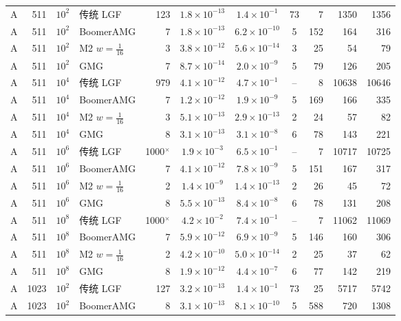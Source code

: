 \begin{longtable}{lrrlrcccrrr}
A & 511 & $10^{2}$ & 传统 LGF & 123 & $1.8{\times}10^{-13}$ & $1.4{\times}10^{-1}$ & 73 & 7 & 1350 & 1356 \\
A & 511 & $10^{2}$ & BoomerAMG & 7 & $1.8{\times}10^{-13}$ & $6.2{\times}10^{-10}$ & 5 & 152 & 164 & 316 \\
A & 511 & $10^{2}$ & M2 $w{=}\frac1{16}$ & 3 & $3.8{\times}10^{-12}$ & $5.6{\times}10^{-14}$ & 3 & 25 & 54 & 79 \\
A & 511 & $10^{2}$ & GMG & 7 & $8.7{\times}10^{-14}$ & $2.0{\times}10^{-9}$ & 5 & 79 & 126 & 205 \\
A & 511 & $10^{4}$ & 传统 LGF & 979 & $4.1{\times}10^{-12}$ & $4.7{\times}10^{-1}$ & -- & 8 & 10638 & 10646 \\
A & 511 & $10^{4}$ & BoomerAMG & 7 & $1.2{\times}10^{-12}$ & $1.9{\times}10^{-9}$ & 5 & 169 & 166 & 335 \\
A & 511 & $10^{4}$ & M2 $w{=}\frac1{16}$ & 3 & $5.1{\times}10^{-13}$ & $2.9{\times}10^{-13}$ & 2 & 24 & 57 & 82 \\
A & 511 & $10^{4}$ & GMG & 8 & $3.1{\times}10^{-13}$ & $3.1{\times}10^{-8}$ & 6 & 78 & 143 & 221 \\
A & 511 & $10^{6}$ & 传统 LGF & 1000$^\times$ & $1.9{\times}10^{-3}$ & $6.5{\times}10^{-1}$ & -- & 7 & 10717 & 10725 \\
A & 511 & $10^{6}$ & BoomerAMG & 7 & $4.1{\times}10^{-12}$ & $7.8{\times}10^{-9}$ & 5 & 151 & 167 & 317 \\
A & 511 & $10^{6}$ & M2 $w{=}\frac1{16}$ & 2 & $1.4{\times}10^{-9}$ & $1.4{\times}10^{-13}$ & 2 & 26 & 45 & 72 \\
A & 511 & $10^{6}$ & GMG & 8 & $5.5{\times}10^{-13}$ & $8.4{\times}10^{-8}$ & 6 & 78 & 131 & 208 \\
A & 511 & $10^{8}$ & 传统 LGF & 1000$^\times$ & $4.2{\times}10^{-2}$ & $7.4{\times}10^{-1}$ & -- & 7 & 11062 & 11069 \\
A & 511 & $10^{8}$ & BoomerAMG & 7 & $5.9{\times}10^{-12}$ & $6.9{\times}10^{-9}$ & 5 & 146 & 160 & 306 \\
A & 511 & $10^{8}$ & M2 $w{=}\frac1{16}$ & 2 & $4.2{\times}10^{-10}$ & $5.0{\times}10^{-14}$ & 2 & 25 & 37 & 62 \\
A & 511 & $10^{8}$ & GMG & 8 & $1.9{\times}10^{-12}$ & $4.4{\times}10^{-7}$ & 6 & 77 & 142 & 219 \\
A & 1023 & $10^{2}$ & 传统 LGF & 127 & $3.2{\times}10^{-13}$ & $1.4{\times}10^{-1}$ & 73 & 25 & 5717 & 5742 \\
A & 1023 & $10^{2}$ & BoomerAMG & 8 & $3.1{\times}10^{-13}$ & $8.1{\times}10^{-10}$ & 5 & 588 & 720 & 1308 \\

\end{longtable}

